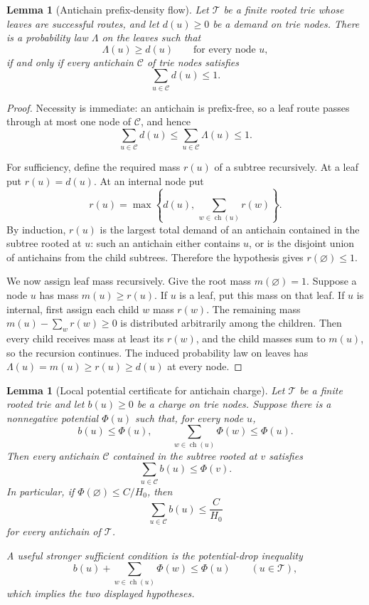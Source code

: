 \documentclass[10pt]{article}
\newtheorem{lemma}[theorem]{Lemma}
\theoremstyle{definition}
\begin{document}
\begin{lemma}[Antichain prefix-density flow]
   \label{lem:antichain-prefix-density-flow}
   Let \(\mathcal T\) be a finite rooted trie whose leaves are successful
   routes, and let \(d(u)\ge0\) be a demand on trie nodes.  There is a
   probability law \(\Lambda\) on the leaves such that
   \[
      \Lambda(u)\ge d(u)
      \qquad\text{for every node }u,
   \]
   if and only if every antichain \(\mathcal C\) of trie nodes satisfies
   \[
      \sum_{u\in\mathcal C}d(u)\le1.
   \]
\end{lemma}

\begin{proof}
   Necessity is immediate: an antichain is prefix-free, so a leaf route passes
   through at most one node of \(\mathcal C\), and hence
   \[
      \sum_{u\in\mathcal C}d(u)
      \le
      \sum_{u\in\mathcal C}\Lambda(u)
      \le1.
   \]

   For sufficiency, define the required mass \(r(u)\) of a subtree recursively.
   At a leaf put \(r(u)=d(u)\).  At an internal node put
   \[
      r(u)=
      \max\left\{
         d(u),\,
         \sum_{w\in\operatorname{ch}(u)}r(w)
      \right\}.
   \]
   By induction, \(r(u)\) is the largest total demand of an antichain contained
   in the subtree rooted at \(u\): such an antichain either contains \(u\), or
   is the disjoint union of antichains from the child subtrees.  Therefore the
   hypothesis gives \(r(\varnothing)\le1\).

   We now assign leaf mass recursively.  Give the root mass \(m(\varnothing)=1\).
   Suppose a node \(u\) has mass \(m(u)\ge r(u)\).  If \(u\) is a leaf, put
   this mass on that leaf.  If \(u\) is internal, first assign each child
   \(w\) mass \(r(w)\).  The remaining mass
   \(m(u)-\sum_wr(w)\ge0\) is distributed arbitrarily among the children.
   Then every child receives mass at least its \(r(w)\), and the child masses
   sum to \(m(u)\), so the recursion continues.  The induced probability law
   on leaves has \(\Lambda(u)=m(u)\ge r(u)\ge d(u)\) at every node.
\end{proof}

\begin{lemma}[Local potential certificate for antichain charge]
   \label{lem:local-antichain-charge-potential}
   Let \(\mathcal T\) be a finite rooted trie and let \(b(u)\ge0\) be a charge
   on trie nodes.  Suppose there is a nonnegative potential \(\Phi(u)\) such
   that, for every node \(u\),
   \[
      b(u)\le\Phi(u),
      \qquad
      \sum_{w\in\operatorname{ch}(u)}\Phi(w)\le\Phi(u).
   \]
   Then every antichain \(\mathcal C\) contained in the subtree rooted at \(v\)
   satisfies
   \[
      \sum_{u\in\mathcal C} b(u)\le\Phi(v).
   \]
   In particular, if \(\Phi(\varnothing)\le C/H_0\), then
   \[
      \sum_{u\in\mathcal C}b(u)\le \frac{C}{H_0}
   \]
   for every antichain of \(\mathcal T\).

   A useful stronger sufficient condition is the potential-drop inequality
   \[
      b(u)+\sum_{w\in\operatorname{ch}(u)}\Phi(w)\le\Phi(u)
      \qquad(u\in\mathcal T),
   \]
   which implies the two displayed hypotheses.
\end{lemma}
\end{document}
